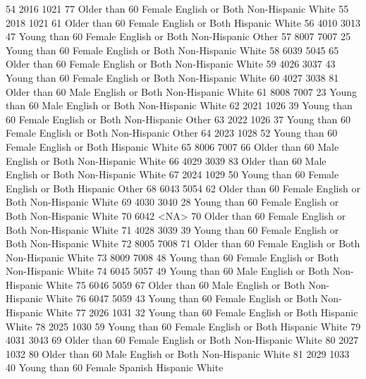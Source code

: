 \documentclass[
  letterpaper,
  DIV=11,
  numbers=noendperiod]{scrreprt}
\newenvironment{Shaded}{\begin{snugshade}}{\end{snugshade}}
\newcommand{\NormalTok}[1]{\textcolor[rgb]{0.00,0.23,0.31}{#1}}
\begin{document}
\begin{Shaded}
\begin{Highlighting}[]
\NormalTok{54  2016 1021  77 Older than 60 Female English or Both Non{-}Hispanic      White}
\NormalTok{55  2018 1021  61 Older than 60 Female English or Both     Hispanic      White}
\NormalTok{56  4010 3013  47 Young than 60 Female English or Both Non{-}Hispanic      Other}
\NormalTok{57  8007 7007  25 Young than 60 Female English or Both Non{-}Hispanic      White}
\NormalTok{58  6039 5045  65 Older than 60 Female English or Both Non{-}Hispanic      White}
\NormalTok{59  4026 3037  43 Young than 60 Female English or Both Non{-}Hispanic      White}
\NormalTok{60  4027 3038  81 Older than 60   Male English or Both Non{-}Hispanic      White}
\NormalTok{61  8008 7007  23 Young than 60   Male English or Both Non{-}Hispanic      White}
\NormalTok{62  2021 1026  39 Young than 60 Female English or Both Non{-}Hispanic      Other}
\NormalTok{63  2022 1026  37 Young than 60 Female English or Both Non{-}Hispanic      Other}
\NormalTok{64  2023 1028  52 Young than 60 Female English or Both     Hispanic      White}
\NormalTok{65  8006 7007  66 Older than 60   Male English or Both Non{-}Hispanic      White}
\NormalTok{66  4029 3039  83 Older than 60   Male English or Both Non{-}Hispanic      White}
\NormalTok{67  2024 1029  50 Young than 60 Female English or Both     Hispanic      Other}
\NormalTok{68  6043 5054  62 Older than 60 Female English or Both Non{-}Hispanic      White}
\NormalTok{69  4030 3040  28 Young than 60 Female English or Both Non{-}Hispanic      White}
\NormalTok{70  6042 \textless{}NA\textgreater{}  70 Older than 60 Female English or Both Non{-}Hispanic      White}
\NormalTok{71  4028 3039  39 Young than 60 Female English or Both Non{-}Hispanic      White}
\NormalTok{72  8005 7008  71 Older than 60 Female English or Both Non{-}Hispanic      White}
\NormalTok{73  8009 7008  48 Young than 60 Female English or Both Non{-}Hispanic      White}
\NormalTok{74  6045 5057  49 Young than 60   Male English or Both Non{-}Hispanic      White}
\NormalTok{75  6046 5059  67 Older than 60   Male English or Both Non{-}Hispanic      White}
\NormalTok{76  6047 5059  43 Young than 60 Female English or Both Non{-}Hispanic      White}
\NormalTok{77  2026 1031  32 Young than 60 Female English or Both     Hispanic      White}
\NormalTok{78  2025 1030  59 Young than 60 Female English or Both     Hispanic      White}
\NormalTok{79  4031 3043  69 Older than 60 Female English or Both Non{-}Hispanic      White}
\NormalTok{80  2027 1032  80 Older than 60   Male English or Both Non{-}Hispanic      White}
\NormalTok{81  2029 1033  40 Young than 60 Female         Spanish     Hispanic      White}

\end{Highlighting}
\end{Shaded}
\end{document}
